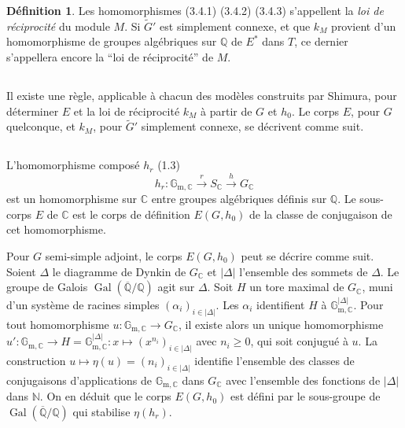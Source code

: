 \documentclass[11pt]{amsart}
\theoremstyle{plain}
\theoremstyle{definition}
\newtheorem{definition}[theorem]{D\'efinition}
\DeclareMathOperator{\Gal}{Gal}
\newcommand{\QQ}{\mathbb{Q}}
\newcommand{\CC}{\mathbb{C}}
\newcommand{\NN}{\mathbb{N}}
\begin{document}
\begin{definition}
Les homomorphismes (3.4.1) (3.4.2) (3.4.3) s'appellent la \emph{loi de r\'eciprocit\'e} du module $M$. Si $\tilde{G}'$ est simplement connexe, et que $k_M$ provient d'un homomorphisme de groupes alg\'ebriques sur $\QQ$ de $E^*$ dans $T$, ce dernier s'appellera encore la ``loi de r\'eciprocit\'e'' de $M$.
\end{definition}

\subsection{}

Il existe une r\`egle, applicable \`a chacun des mod\`eles construits par Shimura, pour d\'eterminer $E$ et la loi de r\'eciprocit\'e $k_M$ \`a partir de $G$ et $h_0$. Le corps $E$, pour $G$ quelconque, et $k_M$, pour $\tilde{G}'$ simplement connexe, se d\'ecrivent comme suit.

\subsection{}

L'homomorphisme compos\'e $h_r$ (1.3)
\[
h_r : \mathbb{G}_{\mathrm{m},\CC} \xrightarrow{\;r\;} S_{\CC} \xrightarrow{\;h\;} G_{\CC}
\]
est un homomorphisme sur $\CC$ entre groupes alg\'ebriques d\'efinis sur $\QQ$. Le sous-corps $E$ de $\CC$ est le corps de d\'efinition $E(G,h_0)$ de la classe de conjugaison de cet homomorphisme.

Pour $G$ semi-simple adjoint, le corps $E(G,h_0)$ peut se d\'ecrire comme suit. Soient $\Delta$ le diagramme de Dynkin de $G_{\CC}$ et $|\Delta|$ l'ensemble des sommets de $\Delta$. Le groupe de Galois $\Gal(\overline{\QQ}/\QQ)$ agit sur $\Delta$. Soit $H$ un tore maximal de $G_{\CC}$, muni d'un syst\`eme de racines simples $(\alpha_i)_{i \in |\Delta|}$. Les $\alpha_i$ identifient $H$ \`a $\mathbb{G}_{\mathrm{m},\CC}^{|\Delta|}$. Pour tout homomorphisme $u : \mathbb{G}_{\mathrm{m},\CC} \to G_{\CC}$, il existe alors un unique homomorphisme $u' : \mathbb{G}_{\mathrm{m},\CC} \to H = \mathbb{G}_{\mathrm{m},\CC}^{|\Delta|} : x \mapsto (x^{n_i})_{i \in |\Delta|}$ avec $n_i \geq 0$, qui soit conjugu\'e \`a $u$. La construction $u \mapsto \eta(u) = (n_i)_{i \in |\Delta|}$ identifie l'ensemble des classes de conjugaisons d'applications de $\mathbb{G}_{\mathrm{m},\CC}$ dans $G_{\CC}$ avec l'ensemble des fonctions de $|\Delta|$ dans $\NN$. On en d\'eduit que le corps $E(G,h_0)$ est d\'efini par le sous-groupe de $\Gal(\overline{\QQ}/\QQ)$ qui stabilise $\eta(h_r)$.
\end{document}
